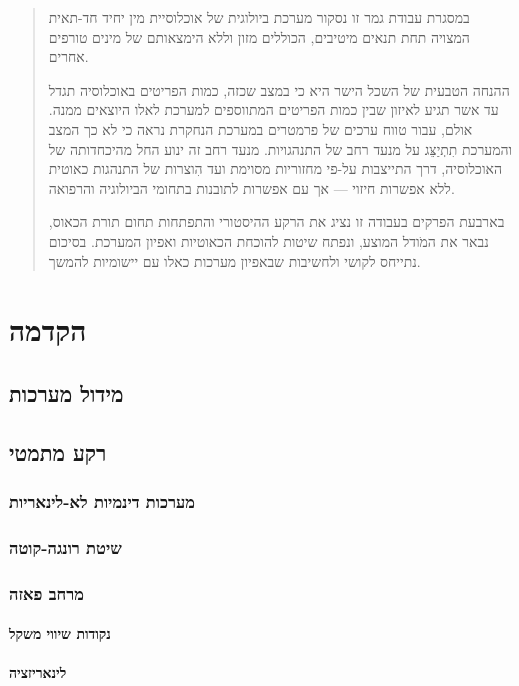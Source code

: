 \documentclass{article}
\begin{document}
\begin{abstract}
\noindent במסגרת עבודת גמר זו נסקור מערכת ביולוגית של אוכלוסיית מין
יחיד חד-תאית המצויה תחת תנאים מיטיבים, הכוללים מזון וללא הימצאותם
של מינים טורפים אחרים.\bigskip
\par\noindent ההנחה הטבעית של השכל הישר היא כי במצב שכזה, כמות הפריטים באוכלוסיה
תגדל עד אשר תגיע לאיזון שבין כמות הפריטים המתווספים למערכת לאלו היוצאים
ממנה. אולם, עבור טווח ערכים של פרמטרים במערכת הנחקרת נראה כי לא כך
המצב והמערכת תִתְיַצֵּג על מנעד רחב של התנהגויות.\newline
מנעד רחב זה ינוע החל מהיכחדותה של האוכלוסיה, דרך התייצבות על-פי מחזוריות
מסוימת ועד הִוצרות של התנהגות כאוטית ללא אפשרות חיזוי — אך עם אפשרות
לתובנות בתחומי הביולוגיה והרפואה.\bigskip
\par\noindent בארבעת הפרקים בעבודה זו נציג את הרקע ההיסטורי והתפתחות תחום
תורת הכאוס, נבאר את המֹודל המוצע, ונפתח שיטות להוכחת הכאוטיות ואפיון
המערכת. בסיכום נתייחס לקושי ולחשיבות שבאפיון מערכות כאלו עם יישומיות
להמשך.
\end{abstract}
\setcounter{page}{1}
\newpage
\tableofcontents
\newpage

\setcounter{page}{1}
\section{הקדמה}
\subsection{מידול מערכות}
\subsection{רקע מתמטי}
\subsubsection{מערכות דינמיות לא-לינאריות}
\subsubsection{שיטת רונגה-קוטה}
\subsubsection{מרחב פאזה}
\paragraph{נקודות שיווי משקל}
\paragraph{לינאריזציה}
\end{document}
